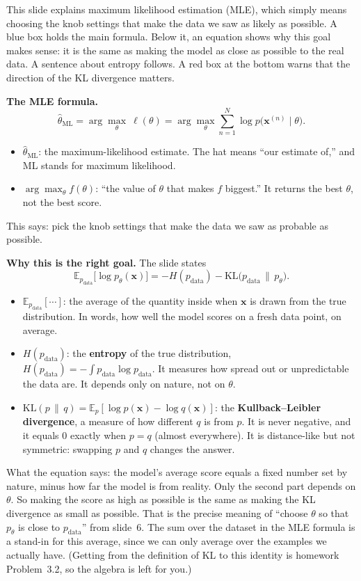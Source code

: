 This slide explains maximum likelihood estimation (MLE), which simply means choosing the knob settings that make the data we saw as likely as possible. A blue box holds the main formula. Below it, an equation shows why this goal makes sense: it is the same as making the model as close as possible to the real data. A sentence about entropy follows. A red box at the bottom warns that the direction of the KL divergence matters.

\textbf{The MLE formula.}
\[
\hat\theta_{\text{ML}}=\arg\max_{\theta}\ \ell(\theta)=\arg\max_{\theta}\sum_{n=1}^{N}\log p\big(\mathbf{x}^{(n)}\mid\theta\big).
\]
\begin{itemize}
\item $\hat\theta_{\text{ML}}$: the maximum-likelihood estimate. The hat means ``our estimate of,'' and ML stands for maximum likelihood.
\item $\arg\max_\theta f(\theta)$: ``the value of $\theta$ that makes $f$ biggest.'' It returns the best $\theta$, not the best score.
\end{itemize}
This says: pick the knob settings that make the data we saw as probable as possible.

\textbf{Why this is the right goal.} The slide states
\[
\mathbb{E}_{p_{\text{data}}}\big[\log p_\theta(\mathbf{x})\big]=-H(p_{\text{data}})-\mathrm{KL}\big(p_{\text{data}}\,\|\,p_\theta\big).
\]
\begin{itemize}
\item $\mathbb{E}_{p_{\text{data}}}[\cdots]$: the average of the quantity inside when $\mathbf{x}$ is drawn from the true distribution. In words, how well the model scores on a fresh data point, on average.
\item $H(p_{\text{data}})$: the \textbf{entropy} of the true distribution, $H(p_{\text{data}})=-\int p_{\text{data}}\log p_{\text{data}}$. It measures how spread out or unpredictable the data are. It depends only on nature, not on $\theta$.
\item $\mathrm{KL}(p\,\|\,q)=\mathbb{E}_p[\log p(\mathbf{x})-\log q(\mathbf{x})]$: the \textbf{Kullback--Leibler divergence}, a measure of how different $q$ is from $p$. It is never negative, and it equals 0 exactly when $p=q$ (almost everywhere). It is distance-like but not symmetric: swapping $p$ and $q$ changes the answer.
\end{itemize}
What the equation says: the model's average score equals a fixed number set by nature, minus how far the model is from reality. Only the second part depends on $\theta$. So making the score as high as possible is the same as making the KL divergence as small as possible. That is the precise meaning of ``choose $\theta$ so that $p_\theta$ is close to $p_{\text{data}}$'' from slide~6. The sum over the dataset in the MLE formula is a stand-in for this average, since we can only average over the examples we actually have. (Getting from the definition of KL to this identity is homework Problem~3.2, so the algebra is left for you.)

